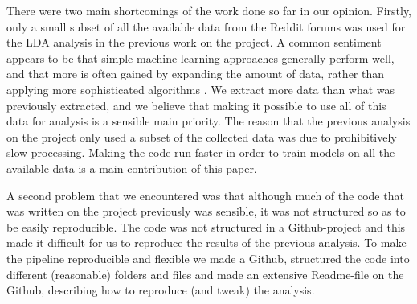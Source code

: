 \documentclass{article}
\begin{document}
There were two main shortcomings of the work done so far in our opinion. Firstly, only a small subset of all the available data from the Reddit forums was used for the LDA analysis in the previous work on the project. A common sentiment appears to be that simple machine learning approaches generally perform well, and that more is often gained by expanding the amount of data, rather than applying more sophisticated algorithms \cite{domingos2012few}. We extract more data than what was previously extracted, and we believe that making it possible to use all of this data for analysis is a sensible main priority. The reason that the previous analysis on the project only used a subset of the collected data was due to prohibitively slow processing. Making the code run faster in order to train models on all the available data is a main contribution of this paper. 

A second problem that we encountered was that although much of the code that was written on the project previously was sensible, it was not structured so as to be easily reproducible. The code was not structured in a Github-project and this made it difficult for us to reproduce the results of the previous analysis. To make the pipeline reproducible and flexible we made a Github, structured the code into different (reasonable) folders and files and made an extensive Readme-file on the Github, describing how to reproduce (and tweak) the analysis.
\end{document}
